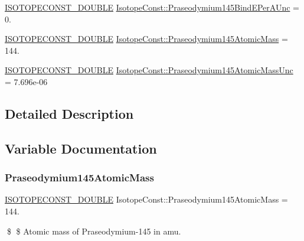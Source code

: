 \begin{DoxyCompactItemize}
\item 
\mbox{\hyperlink{group___isotope_const-_macros_ga8f45a7272ce02c0b4c65c44636ed719a}{I\+S\+O\+T\+O\+P\+E\+C\+O\+N\+S\+T\+\_\+\+D\+O\+U\+B\+LE}} \mbox{\hyperlink{group___isotope_const-_praseodymium-_pr145_gaa66f6e2cd99b1456afbffb57e207d534}{Isotope\+Const\+::\+Praseodymium145\+Bind\+E\+Per\+A\+Unc}} = 0.
\item 
\mbox{\hyperlink{group___isotope_const-_macros_ga8f45a7272ce02c0b4c65c44636ed719a}{I\+S\+O\+T\+O\+P\+E\+C\+O\+N\+S\+T\+\_\+\+D\+O\+U\+B\+LE}} \mbox{\hyperlink{group___isotope_const-_praseodymium-_pr145_gabc6bb2089b2003c68ef6b29d1b2ca05d}{Isotope\+Const\+::\+Praseodymium145\+Atomic\+Mass}} = 144.
\item 
\mbox{\hyperlink{group___isotope_const-_macros_ga8f45a7272ce02c0b4c65c44636ed719a}{I\+S\+O\+T\+O\+P\+E\+C\+O\+N\+S\+T\+\_\+\+D\+O\+U\+B\+LE}} \mbox{\hyperlink{group___isotope_const-_praseodymium-_pr145_gaab4b09566fc55c1e75f0227bc8fd7ff9}{Isotope\+Const\+::\+Praseodymium145\+Atomic\+Mass\+Unc}} = 7.\+696e-\/06
\end{DoxyCompactItemize}


\subsection{Detailed Description}


\subsection{Variable Documentation}
\mbox{\label{group___isotope_const-_praseodymium-_pr145_gabc6bb2089b2003c68ef6b29d1b2ca05d}} 
\subsubsection{\texorpdfstring{Praseodymium145\+Atomic\+Mass}{Praseodymium145AtomicMass}}
{\footnotesize\ttfamily \mbox{\hyperlink{group___isotope_const-_macros_ga8f45a7272ce02c0b4c65c44636ed719a}{I\+S\+O\+T\+O\+P\+E\+C\+O\+N\+S\+T\+\_\+\+D\+O\+U\+B\+LE}} Isotope\+Const\+::\+Praseodymium145\+Atomic\+Mass = 144.}

\$ \$ Atomic mass of Praseodymium-\/145 in amu. \mbox{\label{group___isotope_const-_praseodymium-_pr145_gaab4b09566fc55c1e75f0227bc8fd7ff9}} 

